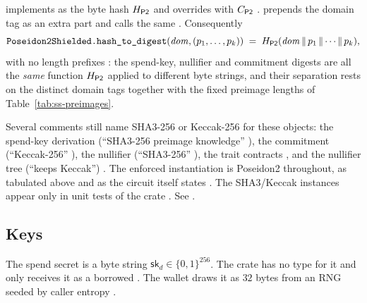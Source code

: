  implements  as the byte hash $H_{\mathsf{P2}}$ and
overrides  with $C_{\mathsf{P2}}$
.  prepends
the domain tag as an extra part and calls the same 
. Consequently
\begin{equation}
\label{eq:shielded-hash}
  \texttt{Poseidon2Shielded.hash\_to\_digest}(\mathit{dom}, (p_1,\dots,p_k))
  \;=\; H_{\mathsf{P2}}(\mathit{dom}\,\|\,p_1\,\|\cdots\|\,p_k),
\end{equation}
with no length prefixes : the
spend-key, nullifier and commitment digests are all the \emph{same} function
$H_{\mathsf{P2}}$ applied to different byte strings, and their separation rests on the
distinct domain tags together with the fixed preimage lengths of
Table~\ref{tab:ss-preimages}.

\begin{specdelta}
\label{delta:ss-sha3}
Several comments still name SHA3-256 or Keccak-256 for these objects: the
spend-key derivation (``SHA3-256 preimage knowledge''
), the commitment (``Keccak-256''
), the nullifier (``SHA3-256''
), the trait contracts
, and the nullifier tree (``keeps
Keccak'') 
. The enforced instantiation is
Poseidon2 throughout, as tabulated above and as the circuit itself states
. The SHA3/Keccak instances
appear only in unit tests of the  crate
. See .
\end{specdelta}

\subsection{Keys}
\label{subsec:ss-keys}

\begin{definition}
The spend secret is a byte string $\mathsf{sk}_d \in \{0,1\}^{256}$. The
 crate has no type for it and only receives it as a borrowed
\code{[u8; 32]} . The wallet draws it as
$32$ bytes from an RNG seeded by caller entropy
.
\end{definition}

